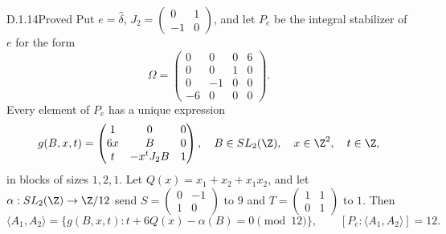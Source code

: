 
\begin{idstatement}{D.1.14}{Proved}\label{st:D.1.14}
Put $e=\widehat\delta$,
$J_2=\left(\begin{smallmatrix}0&1\\-1&0\end{smallmatrix}\right)$,
and let $P_e$ be the integral stabilizer of $e$ for the form
\[
\Omega=\begin{pmatrix}0&0&0&6\\0&0&1&0\\0&-1&0&0\\-6&0&0&0\end{pmatrix}.
\]
Every element of $P_e$ has a unique expression
\[
g(B,x,t)=\begin{pmatrix}1&0&0\\6x&B&0\\t&-x^tJ_2B&1\end{pmatrix},
\quad B\in SL_2(\Z),\quad x\in\Z^2,\quad t\in\Z,
\]
in blocks of sizes $1,2,1$. Let
$Q(x)=x_1+x_2+x_1x_2$, and let
$\alpha:SL_2(\Z)\to\Z/12$ send
$S=\left(\begin{smallmatrix}0&-1\\1&0\end{smallmatrix}\right)$ to $9$
and $T=\left(\begin{smallmatrix}1&1\\0&1\end{smallmatrix}\right)$ to $1$.
Then
\[
\langle A_1,A_2\rangle
=\{g(B,x,t):t+6Q(x)-\alpha(B)=0\pmod{12}\},
\qquad [P_e:\langle A_1,A_2\rangle]=12.
\]
\end{idstatement}
